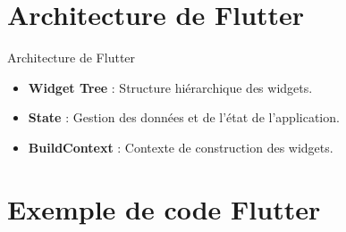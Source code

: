 \documentclass{clbeamer2024}
\begin{document}
	
	
	\section{Architecture de Flutter}
	\begin{frame}{Architecture de Flutter}
		\begin{itemize}
			\item \textbf{Widget Tree} : Structure hiérarchique des widgets.
			\item \textbf{State} : Gestion des données et de l'état de l'application.
			\item \textbf{BuildContext} : Contexte de construction des widgets.
		\end{itemize}
		\end{frame}
		
		\section{Exemple de code Flutter}
		
\end{document}

